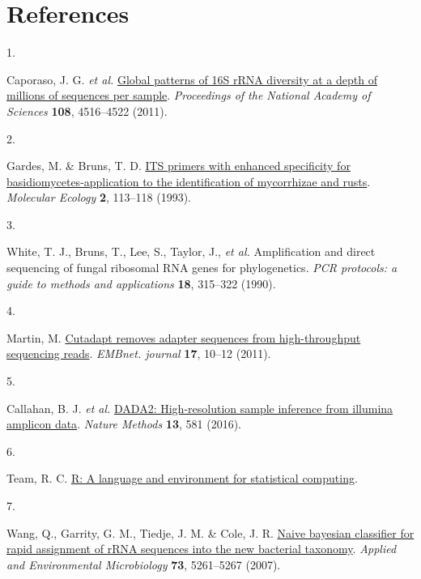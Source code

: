 \documentclass[
  10pt,
  letterpaper,
  DIV=11,
  numbers=noendperiod]{scrartcl}
\newlength{\cslhangindent}
\newlength{\csllabelwidth}
\newlength{\cslentryspacingunit} %
\newenvironment{CSLReferences}[2] %
 {%
  \setlength{\parindent}{0pt}
  \ifodd #1
  \let\oldpar\par
  \def\par{\hangindent=\cslhangindent\oldpar}
  \fi
  \setlength{\parskip}{#2\cslentryspacingunit}
 }%
 {}
\newcommand{\CSLLeftMargin}[1]{\parbox[t]{\csllabelwidth}{#1}}
\newcommand{\CSLRightInline}[1]{\parbox[t]{\linewidth - \csllabelwidth}{#1}\break}
\begin{document}
\newpage{}

\hypertarget{references}{%
\section{References}\label{references}}

\hypertarget{refs}{}
\begin{CSLReferences}{0}{0}
\leavevmode{}%
\CSLLeftMargin{1. }%
\CSLRightInline{Caporaso, J. G. \emph{et al.}
\href{https://doi.org/10.1073/pnas.1000080107}{Global patterns of 16S
rRNA diversity at a depth of millions of sequences per sample}.
\emph{Proceedings of the National Academy of Sciences} \textbf{108},
4516--4522 (2011).}

\leavevmode{}%
\CSLLeftMargin{2. }%
\CSLRightInline{Gardes, M. \& Bruns, T. D.
\href{https://doi.org/10.1111/j.1365-294X.1993.tb00005.x}{ITS primers
with enhanced specificity for basidiomycetes-application to the
identification of mycorrhizae and rusts}. \emph{Molecular Ecology}
\textbf{2}, 113--118 (1993).}

\leavevmode{}%
\CSLLeftMargin{3. }%
\CSLRightInline{White, T. J., Bruns, T., Lee, S., Taylor, J., \emph{et
al.} Amplification and direct sequencing of fungal ribosomal RNA genes
for phylogenetics. \emph{PCR protocols: a guide to methods and
applications} \textbf{18}, 315--322 (1990).}

\leavevmode{}%
\CSLLeftMargin{4. }%
\CSLRightInline{Martin, M.
\href{https://doi.org/10.14806/ej.17.1.200}{Cutadapt removes adapter
sequences from high-throughput sequencing reads}. \emph{EMBnet. journal}
\textbf{17}, 10--12 (2011).}

\leavevmode{}%
\CSLLeftMargin{5. }%
\CSLRightInline{Callahan, B. J. \emph{et al.}
\href{https://doi.org/10.1038/nmeth.3869}{DADA2: High-resolution sample
inference from illumina amplicon data}. \emph{Nature Methods}
\textbf{13}, 581 (2016).}

\leavevmode{}%
\CSLLeftMargin{6. }%
\CSLRightInline{Team, R. C. \href{https://www.R-project.org/}{R: A
language and environment for statistical computing}.}

\leavevmode{}%
\CSLLeftMargin{7. }%
\CSLRightInline{Wang, Q., Garrity, G. M., Tiedje, J. M. \& Cole, J. R.
\href{https://doi.org/10.1128/AEM.00062-07}{Naive bayesian classifier
for rapid assignment of rRNA sequences into the new bacterial taxonomy}.
\emph{Applied and Environmental Microbiology} \textbf{73}, 5261--5267
(2007).}


\end{CSLReferences}
\end{document}
